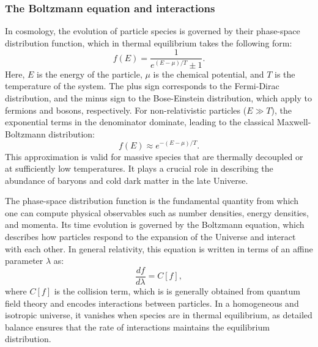 \documentclass{aa}
\numberwithin{equation}{section}
\numberwithin{table}{section}
\numberwithin{figure}{section}
\begin{document}
\subsubsection{The Boltzmann equation and interactions}\label{subsubsec: II theory interactions}
In cosmology, the evolution of particle species is governed by their phase-space distribution function, which in thermal equilibrium takes the following form:
\begin{equation}
f(E) = \frac{1}{e^{(E - \mu) / T} \pm 1}. \label{eq: distribution}
\end{equation}
Here, $E$ is the energy of the particle, $\mu$ is the chemical potential, and $T$ is the temperature of the system. The plus sign corresponds to the Fermi-Dirac distribution, and the minus sign to the Bose-Einstein distribution, which apply to fermions and bosons, respectively. For non-relativistic particles ($E \gg T$), the exponential terms in the denominator dominate, leading to the classical Maxwell-Boltzmann distribution:
\begin{equation}
f(E) \approx e^{-(E - \mu) / T}. \label{eq: Maxwell}
\end{equation}
This approximation is valid for massive species that are thermally decoupled or at sufficiently low temperatures. It plays a crucial role in describing the abundance of baryons and cold dark matter in the late Universe.

The phase-space distribution function is the fundamental quantity from which one can compute physical observables such as number densities, energy densities, and momenta. Its time evolution is governed by the Boltzmann equation, which describes how particles respond to the expansion of the Universe and interact with each other. In general relativity, this equation is written in terms of an affine parameter $\lambda$ as:
\begin{equation}
\frac{df}{d\lambda} = C[f], \label{eq: Boltzmann}
\end{equation}
where $C[f]$ is the collision term, which is is generally obtained from quantum field theory and encodes interactions between particles. In a homogeneous and isotropic universe, it vanishes when species are in thermal equilibrium, as detailed balance ensures that the rate of interactions maintains the equilibrium distribution.
\end{document}
